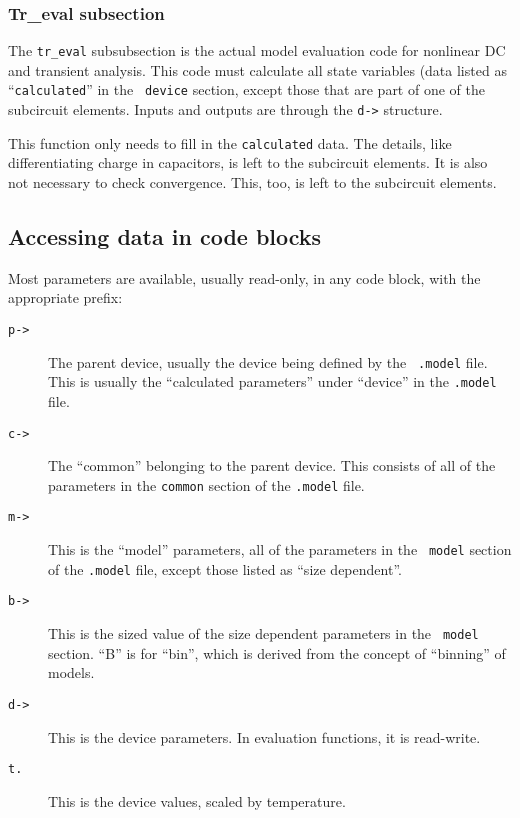 \subsubsection{Tr\_eval subsection}

The {\tt tr\_eval} subsubsection is the actual model evaluation code
for nonlinear DC and transient analysis.  This code must calculate all
state variables (data listed as ``{\tt calculated}'' in the {\tt
device} section, except those that are part of one of the subcircuit
elements.  Inputs and outputs are through the {\tt d->} structure.

This function only needs to fill in the {\tt calculated} data.  The
details, like differentiating charge in capacitors, is left to the
subcircuit elements.  It is also not necessary to check convergence.
This, too, is left to the subcircuit elements.
\subsection{Accessing data in code blocks}

Most parameters are available, usually read-only, in any code block,
with the appropriate prefix:

\begin{description}

\item[{\tt p->}]
The parent device, usually the device being defined by the {\tt
.model} file.  This is usually the ``calculated parameters'' under
``device'' in the {\tt .model} file.

\item[{\tt c->}]
The ``common'' belonging to the parent device.  This consists of all
of the parameters in the {\tt common} section of the {\tt .model}
file.

\item[{\tt m->}]
This is the ``model'' parameters, all of the parameters in the {\tt
model} section of the {\tt .model} file, except those listed as ``size
dependent''.

\item[{\tt b->}]
This is the sized value of the size dependent parameters in the {\tt
model} section.  ``B'' is for ``bin'', which is derived from the
concept of ``binning'' of models.

\item[{\tt d->}]
This is the device parameters.  In evaluation functions, it is
read-write.

\item[{\tt t.}]
This is the device values, scaled by temperature.

\end{description}

